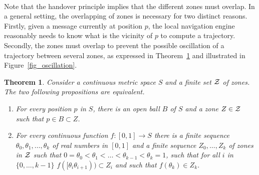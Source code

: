 \documentclass{article}
\newtheorem{theorem}{Theorem}
\begin{document}
\paragraph{}
Note that the handover principle implies that the different zones must overlap. In a general setting, the overlapping of zones is necessary for two distinct reasons. Firstly, given a message currently at position $p$, the local navigation engine reasonably needs to know what is the vicinity of $p$ to compute a trajectory. Secondly, the zones must overlap to prevent the possible oscillation of a trajectory between several zones, as expressed in Theorem~\ref{th_oscillation} and illustrated in Figure~\ref{fig_oscillation}.

\begin{theorem}
Consider a continuous metric space $S$ and a finite set $\cal Z$ of zones.
The two following propositions are equivalent.
\begin{enumerate}
\item For every position $p$ in $S$, there is an open ball $B$ of $S$ and a zone $Z\in \cal Z$ such that $p\in B\subset Z$.
\item For every continuous function $f:[0,1]\rightarrow S$ there is a finite sequence $\theta_0,\theta_1,\dots,\theta_k$ of real numbers in $[0,1]$ and a finite sequence $Z_0,\dots,Z_k$ of zones in $\cal Z$ such that $0=\theta_0<\theta_1<\dots<\theta_{k-1}<\theta_k=1$, such that for all $i$ in $\{0,\dots,k-1\}$ $f([\theta_i\theta_{i+1}))\subset Z_i$ and such that $f(\theta_k)\in Z_k$.
\end{enumerate}
\label{th_oscillation}
\end{theorem}
\end{document}
